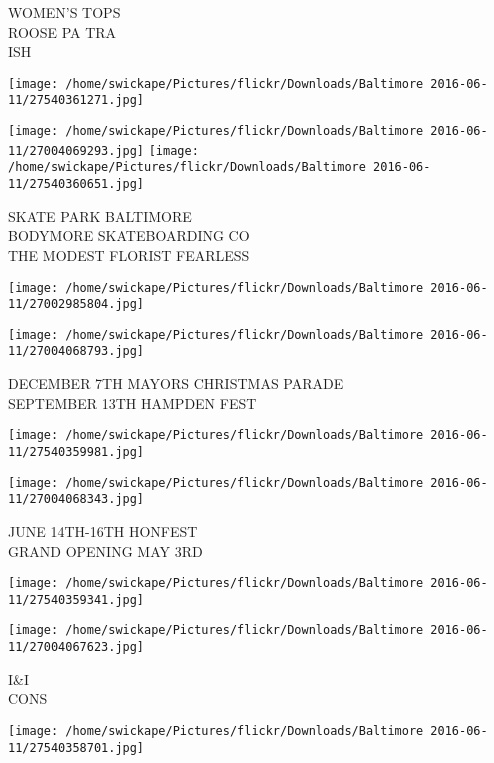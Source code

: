 \documentclass[10pt,letterpaper]{article}
\begin{document}
WOMEN'S TOPS\\
ROOSE PA TRA\\
ISH\\
\pagebreak

\texttt{[image: /home/swickape/Pictures/flickr/Downloads/Baltimore 2016-06-11/27540361271.jpg]}

\vspace{0.25in}
\texttt{[image: /home/swickape/Pictures/flickr/Downloads/Baltimore 2016-06-11/27004069293.jpg]}
\texttt{[image: /home/swickape/Pictures/flickr/Downloads/Baltimore 2016-06-11/27540360651.jpg]}

SKATE PARK BALTIMORE\\
BODYMORE SKATEBOARDING CO\\
THE MODEST FLORIST FEARLESS\\
\pagebreak

\texttt{[image: /home/swickape/Pictures/flickr/Downloads/Baltimore 2016-06-11/27002985804.jpg]}

\vspace{0.25in}
\texttt{[image: /home/swickape/Pictures/flickr/Downloads/Baltimore 2016-06-11/27004068793.jpg]}

DECEMBER 7TH MAYORS CHRISTMAS PARADE\\
SEPTEMBER 13TH HAMPDEN FEST\\
\pagebreak

\texttt{[image: /home/swickape/Pictures/flickr/Downloads/Baltimore 2016-06-11/27540359981.jpg]}

\vspace{0.25in}
\texttt{[image: /home/swickape/Pictures/flickr/Downloads/Baltimore 2016-06-11/27004068343.jpg]}

JUNE 14TH{-}16TH HONFEST\\
GRAND OPENING MAY 3RD\\
\pagebreak

\texttt{[image: /home/swickape/Pictures/flickr/Downloads/Baltimore 2016-06-11/27540359341.jpg]}

\vspace{0.25in}
\texttt{[image: /home/swickape/Pictures/flickr/Downloads/Baltimore 2016-06-11/27004067623.jpg]}

I\&I\\
CONS\\
\pagebreak

\texttt{[image: /home/swickape/Pictures/flickr/Downloads/Baltimore 2016-06-11/27540358701.jpg]}
\end{document}
